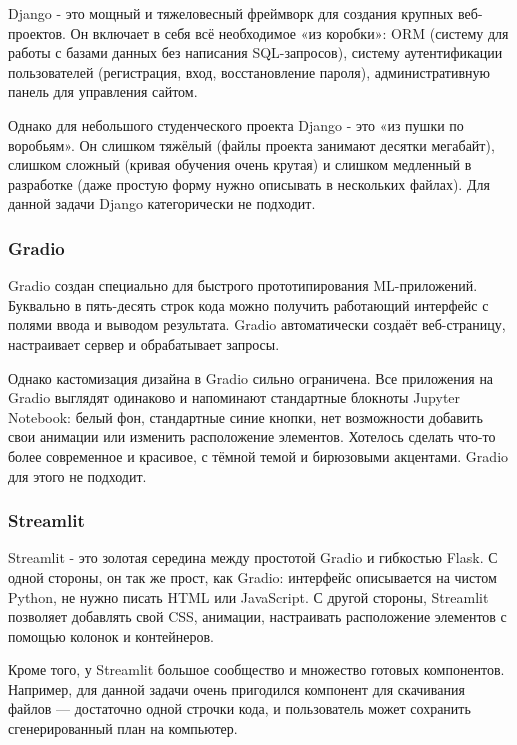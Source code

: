 \documentclass[14pt, a4paper]{extarticle}
\begin{document}
\begin{enumerate}
\noindent Django - это мощный и тяжеловесный фреймворк для создания крупных веб-проектов. Он включает в себя всё необходимое «из коробки»: ORM (систему для работы с базами данных без написания SQL-запросов), систему аутентификации пользователей (регистрация, вход, восстановление пароля), административную панель для управления сайтом.

\medskip
\noindent Однако для небольшого студенческого проекта Django - это «из пушки по воробьям». Он слишком тяжёлый (файлы проекта занимают десятки мегабайт), слишком сложный (кривая обучения очень крутая) и слишком медленный в разработке (даже простую форму нужно описывать в нескольких файлах). Для данной задачи Django категорически не подходит.
\vskip 5cm
\subsubsection{Gradio}

\noindent Gradio создан специально для быстрого прототипирования ML-приложений. Буквально в пять-десять строк кода можно получить работающий интерфейс с полями ввода и выводом результата. Gradio автоматически создаёт веб-страницу, настраивает сервер и обрабатывает запросы.

\medskip
\noindent Однако кастомизация дизайна в Gradio сильно ограничена. Все приложения на Gradio выглядят одинаково и напоминают стандартные блокноты Jupyter Notebook: белый фон, стандартные синие кнопки, нет возможности добавить свои анимации или изменить расположение элементов. Хотелось сделать что-то более современное и красивое, с тёмной темой и бирюзовыми акцентами. Gradio для этого не подходит.

\subsubsection{Streamlit}

\noindent Streamlit - это золотая середина между простотой Gradio и гибкостью Flask. С одной стороны, он так же прост, как Gradio: интерфейс описывается на чистом Python, не нужно писать HTML или JavaScript. С другой стороны, Streamlit позволяет добавлять свой CSS, анимации, настраивать расположение элементов с помощью колонок и контейнеров.

\medskip
\noindent Кроме того, у Streamlit большое сообщество и множество готовых компонентов. Например, для данной задачи очень пригодился компонент для скачивания файлов — достаточно одной строчки кода, и пользователь может сохранить сгенерированный план на компьютер.


\end{enumerate}
\end{document}

